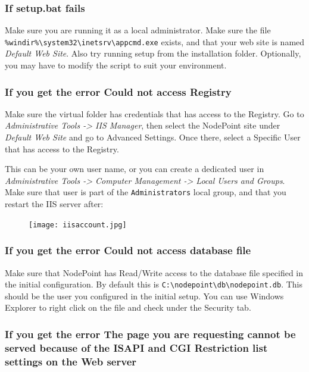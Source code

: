 \documentclass[11pt]{article}
\begin{document}
{
\subsubsection{If setup.bat fails}

Make sure you are running it as a local administrator. Make sure the file \texttt{\%windir\%\textbackslash system32\textbackslash inetsrv\textbackslash appcmd.exe} exists, and that your web site is named \textit{Default Web Site}. Also try running setup from the installation folder. Optionally, you may have to modify the script to suit your environment.

\subsubsection{If you get the error Could not access Registry}

Make sure the virtual folder has credentials that has access to the Registry. Go to \textit{Administrative Tools -> IIS Manager}, then select the NodePoint site under \textit{Default Web Site} and go to Advanced Settings. Once there, select a Specific User that has access to the Registry.

This can be your own user name, or you can create a dedicated user in \textit{Administrative Tools -> Computer Management -> Local Users and Groups}. Make sure that user is part of the \texttt{Administrators} local group, and that you restart the IIS server after:

\begin{figure}[h]
\texttt{[image: iisaccount.jpg]}
\end{figure}

\subsubsection{If you get the error Could not access database file}

Make sure that NodePoint has Read/Write access to the database file specified in the initial configuration. By default this is \texttt{C:\textbackslash nodepoint\textbackslash db\textbackslash nodepoint.db}. This should be the user you configured in the initial setup. You can use Windows Explorer to right click on the file and check under the Security tab.

\subsubsection{If you get the error The page you are requesting cannot be served because of the ISAPI and CGI Restriction list settings on the Web server}

}
\end{document}
